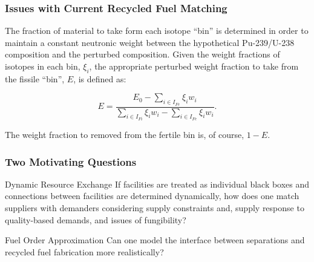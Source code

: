 \begin{frame}[ctb!]
  \frametitle{Issues with Current Recycled Fuel Matching} 
  
  The fraction of material to take form each isotope ``bin'' is determined in
  order to maintain a constant neutronic weight between the hypothetical
  Pu-239/U-238 composition and the perturbed composition. Given the weight
  fractions of isotopes in each bin, $\xi_i$, the appropriate perturbed weight
  fraction to take from the fissile ``bin'', $E$, is defined as:
  
  \begin{equation}
    E = \frac{E_0 - \sum_{i \in I_{Fe}} \xi_i w_i}
    {\sum_{i \in I_{Fi}} \xi_i w_i - \sum_{i \in I_{Fe}} \xi_i w_i}.
  \end{equation}

  The weight fraction to removed from the fertile bin is, of course, $1-E$.

\end{frame}
  
\begin{frame}[ctb!]
  \frametitle{Two Motivating Questions}

  \begin{block}{Dynamic Resource Exchange}
    If facilities are treated as individual black boxes and connections between
    facilities are determined dynamically, how does one match suppliers with
    demanders considering supply constraints and, supply response to
    quality-based demands, and issues of fungibility?
  \end{block}

  \pause

  \begin{block}{Fuel Order Approximation}
    Can one model the interface between separations and recycled fuel
    fabrication more realistically?
  \end{block}

\end{frame}
